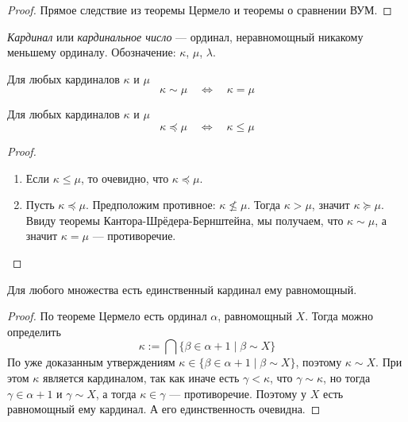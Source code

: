 \documentclass[12pt,a4paper]{article}
\newcommand{\ZFC}{\ensuremath{\mathrm{ZFC}}\xspace}
\begin{document}
    \begin{proof}
        Прямое следствие из теоремы Цермело и теоремы о сравнении ВУМ.
    \end{proof}

    \begin{definition}
        \emph{Кардинал} или \emph{кардинальное число} --- ординал, неравномощный никакому меньшему ординалу. Обозначение: $\kappa$, $\mu$, $\lambda$.
    \end{definition}

    \begin{statement}
        Для любых кардиналов $\kappa$ и $\mu$
        \[\kappa \sim \mu \quad \Longleftrightarrow \quad \kappa = \mu\]
    \end{statement}

    \begin{statement}
        Для любых кардиналов $\kappa$ и $\mu$
        \[\kappa \preccurlyeq \mu \quad \Longleftrightarrow \quad \kappa \leqslant \mu\]
    \end{statement}

    \begin{proof}
        \begin{enumerate}
            \item Если $\kappa \leqslant \mu$, то очевидно, что $\kappa \preccurlyeq \mu$.
            \item Пусть $\kappa \preccurlyeq \mu$. Предположим противное: $\kappa \nleqslant \mu$. Тогда $\kappa > \mu$, значит $\kappa \succcurlyeq \mu$. Ввиду теоремы Кантора-Шрёдера-Бернштейна, мы получаем, что $\kappa \sim \mu$, а значит $\kappa = \mu$ --- противоречие.
        \end{enumerate}
    \end{proof}

    \begin{theorem}[в \ZFC]
        Для любого множества есть единственный кардинал ему равномощный.
    \end{theorem}

    \begin{proof}
        По теореме Цермело есть ординал $\alpha$, равномощный $X$. Тогда можно определить
        \[\kappa := \bigcap \{\beta \in \alpha + 1 \mid \beta \sim X\}\]
        По уже доказанным утверждениям $\kappa \in \{\beta \in \alpha + 1 \mid \beta \sim X\}$, поэтому $\kappa \sim X$. При этом $\kappa$ является кардиналом, так как иначе есть $\gamma < \kappa$, что $\gamma \sim \kappa$, но тогда $\gamma \in \alpha + 1$ и $\gamma \sim X$, а тогда $\kappa \in \gamma$ --- противоречие. Поэтому у $X$ есть равномощный ему кардинал. А его единственность очевидна.
    \end{proof}
\end{document}
